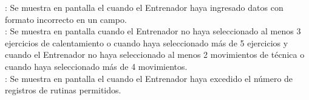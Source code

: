 \textbf{}: Se muestra en pantalla el  cuando el Entrenador haya ingresado datos con formato incorrecto en un campo.\\

\textbf{}: Se muestra en pantalla cuando el Entrenador no haya seleccionado al menos 3 ejercicios de calentamiento o cuando haya seleccionado más de 5 ejercicios y cuando el Entrenador no haya seleccionado al menos 2 movimientos de técnica o cuando haya seleccionado más de 4 movimientos.\\

\textbf{}: Se muestra en pantalla el  cuando el Entrenador haya excedido el número de registros de rutinas permitidos.\\

\clearpage